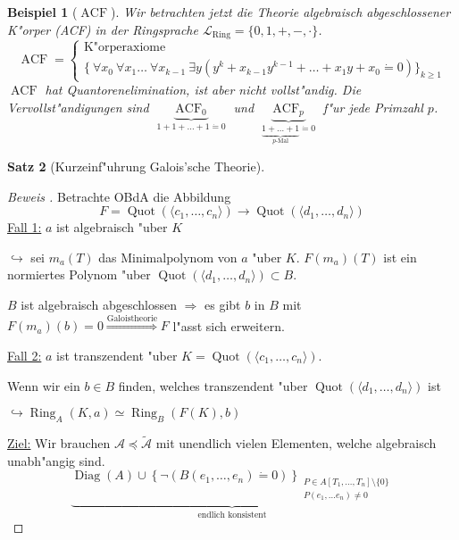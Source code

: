 \documentclass[a4paper,12pt,numbers=noenddot,parskip=full]{scrartcl}
\newcommand{\Forall}{~\forall}
\newcommand{\Exists}{~\exists}
\newcommand{\scrL}{\mathcal{L}}
\newcommand{\scrA}{\mathcal{A}}
\DeclareMathOperator{\Diag}{Diag}
\newcommand{\vdig}{\Diag}
\DeclareMathOperator{\acf}{ACF}
\DeclareMathOperator{\quo}{Quot}
\DeclareMathOperator{\ring}{Ring}
\theoremstyle{dotless}
\newtheorem{theorem}{Satz}[section]
\newtheorem{example}[theorem]{Beispiel}
\begin{document}
\begin{example}[$\acf$]\label{acf:ex}
	Wir betrachten jetzt die Theorie algebraisch abgeschlossener K"orper (ACF) in der Ringsprache $\scrL_\text{Ring}=\{0, 1, +, -, \cdot \}$.
	\begin{equation*}
		\acf = \begin{cases}
		\text{K"orperaxiome}\\
		\{\Forall x_0 \Forall x_1 \dots \Forall x_{k-1} \Exists y (y^k + x_{k-1} y^{k-1} + \dots + x_1 y + x_0 \dot= 0) \}_{k \geq 1}
		\end{cases}
	\end{equation*}
	$\acf$ hat Quantorenelimination, ist aber nicht vollst"andig. Die Vervollst"andigungen sind $\underbrace{\acf_0}_{1+1+ \dots + 1 \dot= 0}$ und $\underbrace{\acf_p}_{\underbrace{1+\dots+1}_{p\text{-Mal}} \dot= 0}$ f"ur jede Primzahl $p$.
\end{example}

\begin{theorem}[Kurzeinf"uhrung Galois'sche Theorie]
\end{theorem}

\begin{proof}[Beweis ]
	Betrachte OBdA die Abbildung
	\begin{equation*}
		F = \quo (\langle c_1, \dots, c_n \rangle) \longrightarrow \quo (\langle d_1, \dots, d_n \rangle)
	\end{equation*}
	\underline{Fall 1:} $a$ ist algebraisch "uber $K$
	
	$\hookrightarrow$ sei $m_a(T)$ das Minimalpolynom von $a$ "uber $K$. $F(m_a)(T)$ ist ein normiertes Polynom "uber $\quo(\langle d_1, \dots, d_n \rangle) \subset B$.
	
	$B$ ist algebraisch abgeschlossen $\Rightarrow$ es gibt $b$ in $B$ mit $F(m_a)(b)=0 \overset{\text{Galoistheorie}}{\Longrightarrow} F$ l"asst sich erweitern. 
	
	\underline{Fall 2:} $a$ ist transzendent "uber $K = \quo (\langle c_1, \dots, c_n \rangle)$.
	
	Wenn wir ein $b \in B$ finden, welches transzendent "uber $\quo(\langle d_1, \dots, d_n \rangle)$ ist
	
	$\hookrightarrow \ring_A (K, a) \simeq \ring_B (F(K), b)$
	
	\underline{Ziel:} Wir brauchen $\scrA \preceq \tilde{\scrA}$ mit unendlich vielen Elementen, welche algebraisch unabh"angig sind.
	\begin{equation*}
		\underbrace{\vdig(A) \cup \left\{\lnot (B(e_1, \dots, e_n)\dot= 0) \right\}_{\substack{P \in A[T_1, \dots, T_n] \setminus \{0\}\\P(e_1, \dots e_n) \neq 0}}}_{\text{endlich konsistent}}
	\end{equation*}
\end{proof}
\end{document}

